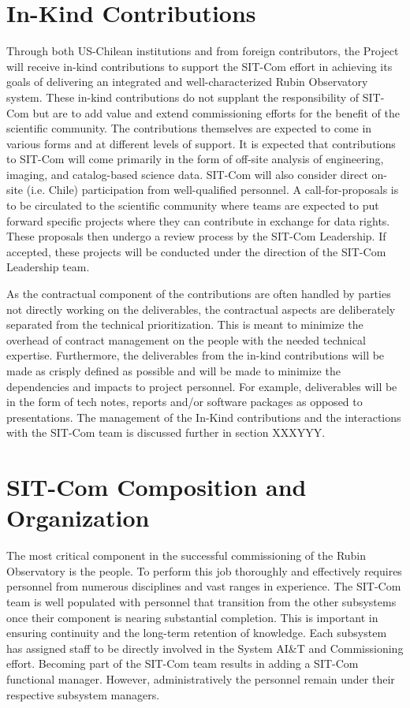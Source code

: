 \documentclass[SE,toc]{lsstdoc}
\begin{document}
\section{In-Kind Contributions}
\label{sec:in_kind}

Through both US-Chilean institutions and from foreign contributors, the Project will receive in-kind contributions to support the SIT-Com effort in achieving its goals of delivering an integrated and well-characterized Rubin Observatory system.
These in-kind contributions do not supplant the responsibility of SIT-Com but are to add value and extend commissioning efforts for the benefit of the scientific community.
The contributions themselves are expected to come in various forms and at different levels of support.
It is expected that contributions to SIT-Com will come primarily in the form of off-site analysis of engineering, imaging, and catalog-based science data.
SIT-Com will also consider direct on-site (i.e. Chile) participation from well-qualified personnel.
A call-for-proposals is to be circulated to the scientific community where teams are expected to put forward specific projects where they can contribute in exchange for data rights. These proposals then undergo a review process by the SIT-Com Leadership. If accepted, these projects will be conducted under the direction of the SIT-Com Leadership team.

As the contractual component of the contributions are often handled by parties not directly working on the deliverables, the contractual aspects are deliberately separated from the technical prioritization.
This is meant to minimize the overhead of contract management on the people with the needed technical expertise.
Furthermore, the deliverables from the in-kind contributions will be made as crisply defined as possible and will be made to minimize the dependencies and impacts to project personnel.
For example, deliverables will be in the form of tech notes, reports and/or software packages as opposed to presentations.
The management of the In-Kind contributions and the interactions with the SIT-Com team is discussed further in section XXXYYY.

\section{SIT-Com Composition and Organization}
The most critical component in the successful commissioning of the Rubin Observatory is the people.
To perform this job thoroughly and effectively requires personnel from numerous disciplines and vast ranges in experience.
The SIT-Com team is well populated with personnel that transition from the other subsystems once their component is nearing substantial completion.
This is important in ensuring continuity and the long-term retention of knowledge.
Each subsystem has assigned staff to be directly involved in the System AI\&T and Commissioning effort.
Becoming part of the SIT-Com team results in adding a SIT-Com functional manager. However, administratively the personnel remain under their respective subsystem managers.
\end{document}

